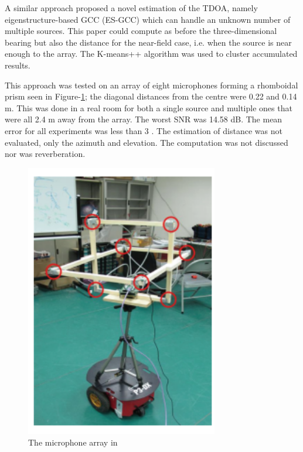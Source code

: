 \documentclass[notitlepage]{report}
\begin{document}
A similar approach \cite{hu_estimation_2009} proposed a novel estimation of the TDOA, namely eigenstructure-based GCC (ES-GCC) which can handle an unknown number of multiple sources. This paper could compute as before the three-dimensional bearing but also the distance for the near-field case, i.e. when the source is near enough to the array. The K-means++ algorithm was used to cluster accumulated results. 

This approach was tested on an array of eight microphones forming a rhomboidal prism seen in Figure-\ref{fig:hu_2009_plot}; the diagonal distances from the centre were 0.22 and 0.14 \si{m}. This was done in a real room for both a single source and multiple ones that were all 2.4 \si{m} away from the array. The worst SNR was 14.58 \si{dB}. The mean error for all experiments was less than 3 \si{\deg}. The estimation of distance was not evaluated, only the azimuth and elevation. The computation was not discussed nor was reverberation.

\begin{figure}[H]
\includegraphics[width=0.75\textwidth]{./hu_2009/array.png}
\centering
\caption{The microphone array in \cite{hu_estimation_2009}}
\label{fig:hu_2009_plot}
\centering
\end{figure}
\end{document}
